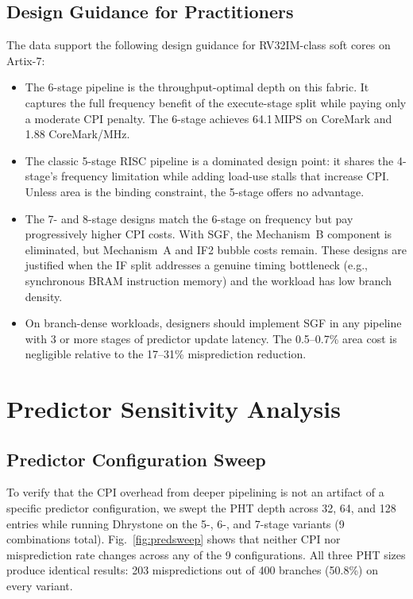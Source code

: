 \documentclass[journal]{IEEEtran}
\begin{document}
\begin{table}[t]
\begin{table}[t]
\begin{table}[t]
\begin{table}[t]
\begin{table}[t]
\begin{table}[t]
\begin{table}[t]
\subsection{Design Guidance for Practitioners}

The data support the following design guidance for RV32IM-class soft cores on Artix-7:
\begin{itemize}
\item The 6-stage pipeline is the throughput-optimal depth on this fabric. It captures the full frequency benefit of the execute-stage split while paying only a moderate CPI penalty. The 6-stage achieves 64.1\,MIPS on CoreMark and 1.88 CoreMark/MHz.
\item The classic 5-stage RISC pipeline is a dominated design point: it shares the 4-stage's frequency limitation while adding load-use stalls that increase CPI. Unless area is the binding constraint, the 5-stage offers no advantage.
\item The 7- and 8-stage designs match the 6-stage on frequency but pay progressively higher CPI costs. With SGF, the Mechanism~B component is eliminated, but Mechanism~A and IF2 bubble costs remain. These designs are justified when the IF split addresses a genuine timing bottleneck (e.g., synchronous BRAM instruction memory) and the workload has low branch density.
\item On branch-dense workloads, designers should implement SGF in any pipeline with 3 or more stages of predictor update latency. The 0.5--0.7\% area cost is negligible relative to the 17--31\% misprediction reduction.
\end{itemize}

\section{Predictor Sensitivity Analysis}

\subsection{Predictor Configuration Sweep}

To verify that the CPI overhead from deeper pipelining is not an artifact of a specific predictor configuration, we swept the PHT depth across 32, 64, and 128 entries while running Dhrystone on the 5-, 6-, and 7-stage variants (9 combinations total). Fig.~\ref{fig:predsweep} shows that neither CPI nor misprediction rate changes across any of the 9 configurations. All three PHT sizes produce identical results: 203 mispredictions out of 400 branches (50.8\%) on every variant.


\end{table}
\end{table}
\end{table}
\end{table}
\end{table}
\end{table}
\end{table}
\end{document}

